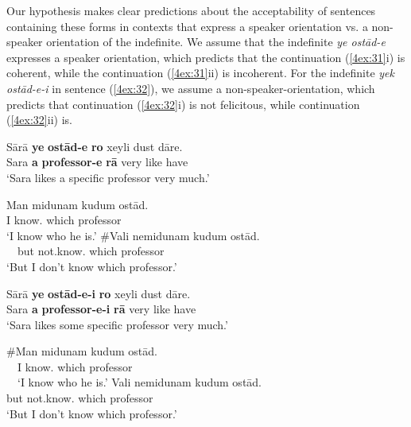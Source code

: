 \documentclass[output=paper]{langsci/langscibook}
\begin{document}
Our hypothesis makes clear predictions about the acceptability of sentences containing these forms in contexts that express a speaker orientation vs. a non-speaker orientation of the indefinite. We assume that the indefinite {\emph{ye ostād-e}} expresses a speaker orientation, which predicts that the continuation (\ref{4ex:31}i) is coherent, while the continuation (\ref{4ex:31}ii) is incoherent. For the indefinite {\emph{yek ostād-e-i}} in sentence (\ref{4ex:32}), we assume a non-speaker-orientation, which predicts that continuation (\ref{4ex:32}i) is not felicitous, while continuation (\ref{4ex:32}ii) is.

\begin{exe}
\ex\label{4ex:31}
\gll	Sārā  {\bf{ye}} {\bf{ostād-e}} 	{\bf{ro}}  	xeyli dust  dāre. \\
         Sara   {\bf{a}}   {\bf{professor-e}} {\bf{rā}} 	very  like   have	 \\
\glt	`Sara likes a specific professor very much.' 
	\begin{xlista}
	\gll	Man midunam   kudum 	ostād. \\
		I       know.{} which   	professor \\
	\glt	`I know who he is.'
	\gll	\#Vali nemidunam     kudum 	ostād. \\
		\ \ but  not.know.{} 	which  	professor \\
	\glt	`But I don't know which professor.'
	\end{xlista}
\ex\label{4ex:32}
\gll	Sārā  {\bf{ye}} {\bf{ostād-e-i}}      {\bf{ro}}   	xeyli dust dāre.  \\
         Sara   {\bf{a}}  {\bf{professor-e-i}} {\bf{rā}} 		very  like  have \\
\glt	`Sara likes some specific professor very much.'
	\begin{xlista}
	\exi{(i)}
	\gll	\#Man midunam   kudum ostād. \\
		\ \ I       know.{} 	which   professor \\
	\glt	\ \ `I know who he is.'
	\exi{(ii)}
	\gll	Vali nemidunam     kudum ostād. \\
		but not.know.{}  which  professor \\
	\glt	`But I don't know which professor.'
	\end{xlista}
\end{exe}
\end{document}
